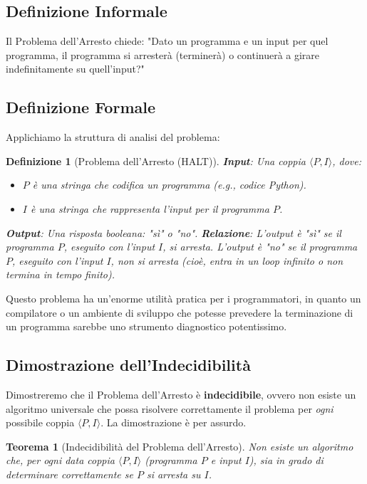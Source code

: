 \documentclass[a4paper]{article}
\newtheorem{theorem}{Teorema}
\newtheorem{definition}{Definizione}
\begin{document}
\subsection{Definizione Informale}
Il Problema dell'Arresto chiede: "Dato un programma e un input per quel programma, il programma si arresterà (terminerà) o continuerà a girare indefinitamente su quell'input?"

\subsection{Definizione Formale}
Applichiamo la struttura di analisi del problema:

\begin{definition}[Problema dell'Arresto (HALT)]
\textbf{Input}: Una coppia $\langle P, I \rangle$, dove:
\begin{itemize}
    \item $P$ è una stringa che codifica un programma (e.g., codice Python).
    \item $I$ è una stringa che rappresenta l'input per il programma $P$.
\end{itemize}
\textbf{Output}: Una risposta booleana: "sì" o "no".
\textbf{Relazione}: L'output è "sì" se il programma $P$, eseguito con l'input $I$, si arresta. L'output è "no" se il programma $P$, eseguito con l'input $I$, non si arresta (cioè, entra in un loop infinito o non termina in tempo finito).
\end{definition}

Questo problema ha un'enorme utilità pratica per i programmatori, in quanto un compilatore o un ambiente di sviluppo che potesse prevedere la terminazione di un programma sarebbe uno strumento diagnostico potentissimo.

\subsection{Dimostrazione dell'Indecidibilità}
Dimostreremo che il Problema dell'Arresto è \textbf{indecidibile}, ovvero non esiste un algoritmo universale che possa risolvere correttamente il problema per \emph{ogni} possibile coppia $\langle P, I \rangle$. La dimostrazione è per assurdo.

\begin{theorem}[Indecidibilità del Problema dell'Arresto]
Non esiste un algoritmo che, per ogni data coppia $\langle P, I \rangle$ (programma $P$ e input $I$), sia in grado di determinare correttamente se $P$ si arresta su $I$.
\end{theorem}
\end{document}
